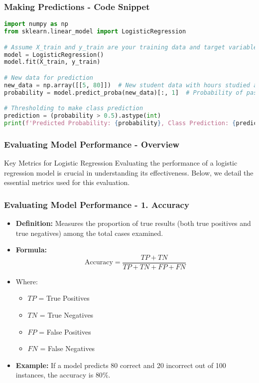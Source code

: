 \documentclass[aspectratio=169]{beamer}
\begin{document}
\begin{frame}[fragile]
  \frametitle{Making Predictions - Code Snippet}
  \begin{lstlisting}[language=Python]
import numpy as np
from sklearn.linear_model import LogisticRegression

# Assume X_train and y_train are your training data and target variable
model = LogisticRegression()
model.fit(X_train, y_train)

# New data for prediction
new_data = np.array([[5, 80]])  # New student data with hours studied and previous grade
probability = model.predict_proba(new_data)[:, 1]  # Probability of passing (class 1)

# Thresholding to make class prediction
prediction = (probability > 0.5).astype(int)
print(f'Predicted Probability: {probability}, Class Prediction: {prediction}')
  \end{lstlisting}
\end{frame}

\begin{frame}[fragile]
    \frametitle{Evaluating Model Performance - Overview}
    \begin{block}{Key Metrics for Logistic Regression}
        Evaluating the performance of a logistic regression model is crucial in understanding its effectiveness. Below, we detail the essential metrics used for this evaluation.
    \end{block}
\end{frame}

\begin{frame}[fragile]
    \frametitle{Evaluating Model Performance - 1. Accuracy}
    \begin{itemize}
        \item \textbf{Definition:} Measures the proportion of true results (both true positives and true negatives) among the total cases examined.
        \item \textbf{Formula:} 
        \begin{equation}
            \text{Accuracy} = \frac{TP + TN}{TP + TN + FP + FN}
        \end{equation}
        \item Where:
        \begin{itemize}
            \item \( TP \) = True Positives
            \item \( TN \) = True Negatives
            \item \( FP \) = False Positives
            \item \( FN \) = False Negatives
        \end{itemize}
        \item \textbf{Example:} If a model predicts 80 correct and 20 incorrect out of 100 instances, the accuracy is \( 80\% \).
    \end{itemize}
\end{frame}
\end{document}
